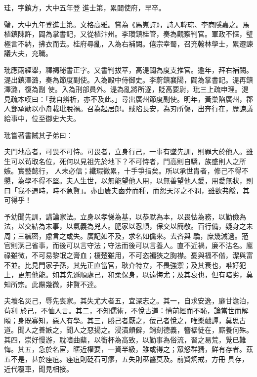 \begin{pinyinscope}
 珪，字鎮方，大中五年登
 進士第，累闢使府，早卒。



 璧，大中九年登進士第。文格高雅。嘗為《馬嵬詩》，詩人韓琮、李商隱嘉之。馬植鎮陳許，闢為掌書記，又從植汴州。李瓚鎮桂管，奏為觀察判官。軍政不愜，璧極言不納，拂衣而去。桂府尋亂，入為右補闕。僖宗幸蜀，召充翰林學士，累遷諫議大夫，充職。



 玭應兩經舉，釋褐秘書正字。又書判拔萃，高湜闢為度支推官。逾年，拜右補闕。湜出鎮澤潞，奏為節度副使。入為殿中侍御史。李蔚鎮襄陽，闢為掌書記。湜再鎮澤潞，復為副
 使。入為刑部員外。湜為亂將所逐，貶高要尉，玭三上疏申理。湜見疏本嘆曰：「我自辨析，亦不及此。」尋出廣州節度副使。明年，黃巢陷廣州，郡人鄧承勛以小舟載玭脫禍。召為起居郎。賊陷長安，為刃所傷，出奔行在，歷諫議給事中，位至御史大夫。



 玭嘗著書誡其子弟曰：



 夫門地高者，可畏不可恃。可畏者，立身行己，一事有墜先訓，則罪大於他人。雖生可以茍取名位，死何以見祖先於地下？不可恃者，門高則自驕，族盛則人之所嫉。實藝懿行，
 人未必信；纖瑕微累，十手爭指矣。所以承世胄者，修己不得不懇，為學不得不堅。夫人生世，以無能望他人用，以無善望他人愛，用愛無狀，則曰「我不遇時，時不急賢」。亦由農夫鹵莽而種，而怨天澤之不潤，雖欲弗餒，其可得乎！



 予幼聞先訓，講論家法。立身以孝悌為基，以恭默為本，以畏怯為務，以勤儉為法，以交結為末事，以氣義為兇人。肥家以忍順，保交以簡敬。百行備，疑身之未周；三緘密，慮言之或失。廣記如不及，求名如儻來。去吝與
 驕，庶幾減過。蒞官則潔己省事，而後可以言守法；守法而後可以言養人。直不近禍，廉不沽名。廩祿雖微，不可易黎氓之膏血；榎楚雖用，不可恣褊狹之胸襟。憂與福不偕，潔與富不並。比見門家子孫，其先正直當官，耿介特立，不畏強禦；及其衰也，唯好犯上，更無他能。如其先遜順處己，和柔保身，以遠悔尤；及其衰也，但有暗劣，莫知所宗。此際幾微，非賢不達。



 夫壞名災己，辱先喪家。其失尤大者五，宜深志之。其一，自求安逸，靡甘澹泊，茍利
 於己，不恤人言。其二，不知儒術，不悅古道：懵前經而不恥，論當世而解頤；身既寡知，惡人有學。其三，勝己者厭之，佞己者悅之，唯樂戲譚，莫思古道。聞人之善嫉之，聞人之惡揚之。浸漬頗僻，銷刻德義，簪裾徒在，廝養何殊。其四，崇好慢游，耽嗜曲糵，以銜杯為高致，以勤事為俗流，習之易荒，覺已難悔。其五，急於名宦，暱近權要，一資半級，雖或得之；眾怒群猜，鮮有存者。茲五不是，甚於痤疽。痤疽則砭石可瘳，五失則巫醫莫及。前賢炯戒，方冊
 具存，近代覆車，聞見相接。




\end{pinyinscope}
